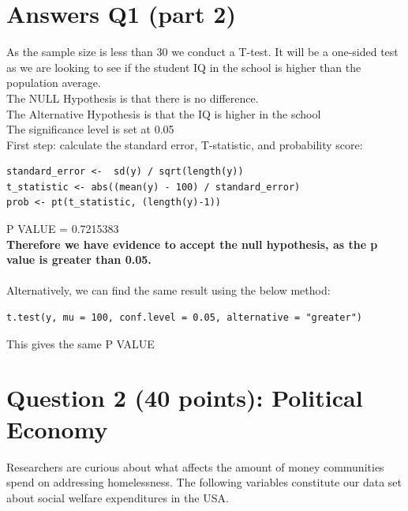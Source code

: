 \documentclass[12pt,letterpaper]{article}
\begin{document}
\newpage

\section*{Answers Q1 (part 2)}

\noindent  As the sample size is less than 30 we conduct a T-test. It will be a one-sided test as we are looking to see if the student IQ in the school is higher than the population average. \\

The NULL Hypothesis is that there is no difference. \\

The Alternative Hypothesis is that the IQ is higher in the school \\

The significance level is set at 0.05 \\

First step: calculate the standard error, T-statistic, and probability score: 

\begin{verbatim}
standard_error <-  sd(y) / sqrt(length(y))
t_statistic <- abs((mean(y) - 100) / standard_error)
prob <- pt(t_statistic, (length(y)-1))
\end{verbatim}

P VALUE = 0.7215383 \\

\noindent \textbf {Therefore we have evidence to accept the null hypothesis, as the p value is greater than 0.05.} \\

\\

\noindent Alternatively, we can find the same result using the below method: 

\begin{verbatim}
t.test(y, mu = 100, conf.level = 0.05, alternative = "greater")
\end{verbatim}

This gives the same P VALUE

\newpage

	\section*{Question 2 (40 points): Political Economy}
	




\noindent Researchers are curious about what affects the amount of money communities spend on addressing homelessness. The following variables constitute our data set about social welfare expenditures in the USA. \\
\vspace{.5cm}
\end{document}
